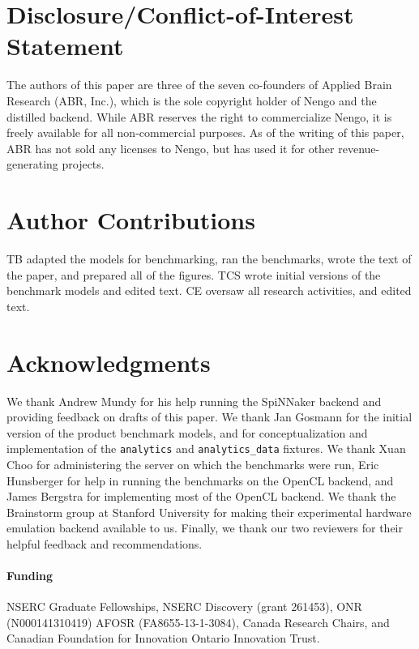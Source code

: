 \documentclass{frontiersSCNS}
\begin{document}
\section*{Disclosure/Conflict-of-Interest Statement}

The authors of this paper
are three of the seven co-founders
of Applied Brain Research (ABR, Inc.),
which is the sole copyright holder
of Nengo and the distilled backend.
While ABR reserves the right
to commercialize Nengo,
it is freely available
for all non-commercial purposes.
As of the writing of this paper,
ABR has not sold any licenses to Nengo,
but has used it
for other revenue-generating projects.

\section*{Author Contributions}

TB adapted the models for benchmarking,
ran the benchmarks,
wrote the text of the paper,
and prepared all of the figures.
TCS wrote initial versions of the benchmark models
and edited text.
CE oversaw all research activities,
and edited text.

\section*{Acknowledgments}

We thank Andrew Mundy for his help
running the SpiNNaker backend
and providing feedback on drafts of this paper.
We thank Jan Gosmann for the initial version
of the product benchmark models,
and for conceptualization and implementation
of the \texttt{analytics} and \texttt{analytics\_data}
fixtures.
We thank Xuan Choo for administering
the server on which the benchmarks were run,
Eric Hunsberger for help in running
the benchmarks on the OpenCL backend,
and James Bergstra for
implementing most of the OpenCL backend.
We thank the Brainstorm group
at Stanford University for making
their experimental hardware emulation backend
available to us.
Finally, we thank our two reviewers for
their helpful feedback and recommendations.

\paragraph{Funding\textcolon}
NSERC Graduate Fellowships,
NSERC Discovery (grant 261453),
ONR (N000141310419)
AFOSR (FA8655-13-1-3084),
Canada Research Chairs,
and Canadian Foundation for Innovation
Ontario Innovation Trust.
\end{document}

